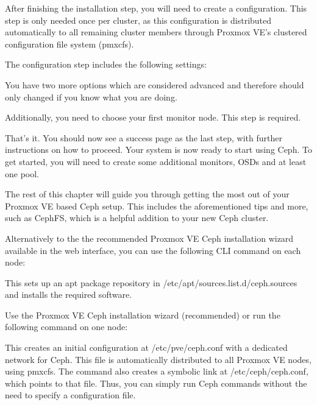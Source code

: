 After finishing the installation step, you will need to create a configuration. This step is only needed once per cluster, as this configuration is distributed automatically to all remaining cluster members through Proxmox VE’s clustered configuration file system (pmxcfs).

The configuration step includes the following settings:

You have two more options which are considered advanced and therefore should only changed if you know what you are doing.

Additionally, you need to choose your first monitor node. This step is required.

That’s it. You should now see a success page as the last step, with further instructions on how to proceed. Your system is now ready to start using Ceph. To get started, you will need to create some additional monitors, OSDs and at least one pool.

The rest of this chapter will guide you through getting the most out of your Proxmox VE based Ceph setup. This includes the aforementioned tips and more, such as CephFS, which is a helpful addition to your new Ceph cluster.

Alternatively to the the recommended Proxmox VE Ceph installation wizard available in the web interface, you can use the following CLI command on each node:

This sets up an apt package repository in /etc/apt/sources.list.d/ceph.sources and installs the required software.

Use the Proxmox VE Ceph installation wizard (recommended) or run the following command on one node:

This creates an initial configuration at /etc/pve/ceph.conf with a dedicated network for Ceph. This file is automatically distributed to all Proxmox VE nodes, using pmxcfs. The command also creates a symbolic link at /etc/ceph/ceph.conf, which points to that file. Thus, you can simply run Ceph commands without the need to specify a configuration file.


